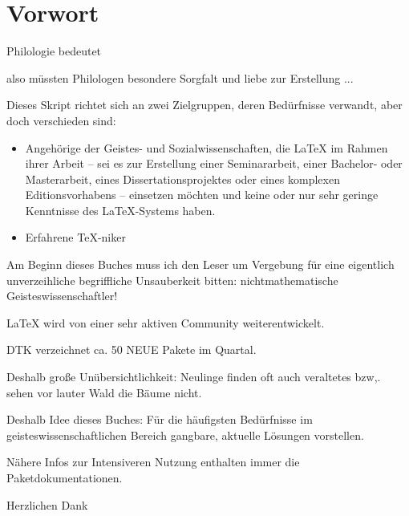 \chapter{Vorwort}

Philologie bedeutet

also müssten Philologen besondere Sorgfalt und liebe zur Erstellung ...

Dieses Skript richtet sich an zwei Zielgruppen, deren Bedürfnisse verwandt, aber doch verschieden sind:

\begin{itemize}
 \item Angehörige der Geistes- und Sozialwissenschaften, die \LaTeX{} im Rahmen ihrer Arbeit
 -- sei es zur Erstellung einer Seminararbeit, einer Bachelor- oder Masterarbeit, eines
 Dissertationsprojektes oder eines komplexen Editionsvorhabens --
 einsetzen möchten und keine oder nur sehr geringe Kenntnisse des \LaTeX{}-Systems haben.
 \item Erfahrene \TeX-niker
\end{itemize}

Am Beginn dieses Buches muss ich den Leser um Vergebung für eine eigentlich unverzeihliche begriffliche
Unsauberkeit bitten: nichtmathematische Geisteswissenschaftler!

\LaTeX{} wird von einer sehr aktiven Community weiterentwickelt.

DTK verzeichnet ca. 50 NEUE Pakete im Quartal.

Deshalb große Unübersichtlichkeit: Neulinge finden oft auch veraltetes bzw,. sehen vor lauter
Wald die Bäume nicht.

Deshalb Idee dieses Buches: Für die häufigsten Bedürfnisse im geisteswissenschaftlichen
Bereich gangbare, aktuelle Lösungen vorstellen.

Nähere Infos zur Intensiveren Nutzung enthalten immer die Paketdokumentationen.

Herzlichen Dank 
\endinput
